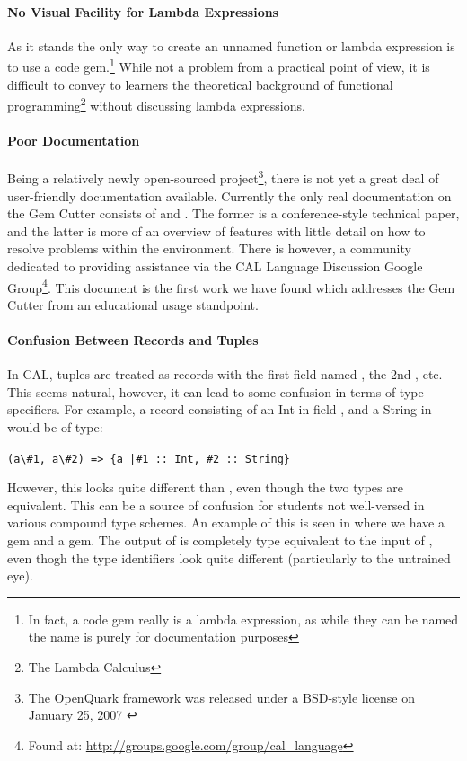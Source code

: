 \paragraph{No Visual Facility for Lambda Expressions}

As it stands the only way to create an unnamed function or lambda expression is to use a code gem.\footnote{In fact, a code gem really is a lambda expression, as while they can be named the name is purely for documentation purposes}  While not a problem from a practical point of view, it is difficult to convey to learners the theoretical background of functional programming\footnote{The Lambda Calculus} without discussing lambda expressions.

\paragraph{Poor Documentation}

Being a relatively newly open-sourced project\footnote{The OpenQuark framework was released under a BSD-style license on January 25, 2007 \cite{bobjNews}}, there is not yet a great deal of user-friendly documentation available.  Currently the only real documentation on the Gem Cutter consists of \cite{evans07} and \cite{evans06}.  The former is a conference-style technical paper, and the latter is more of an overview of features with little detail on how to resolve problems within the environment.  There is however, a community dedicated to providing assistance via the CAL Language Discussion Google Group\footnote{Found at: \url{http://groups.google.com/group/cal_language}}.  This document is the first work we have found which addresses the Gem Cutter from an educational usage standpoint.

\paragraph{Confusion Between Records and Tuples}

In CAL, tuples are treated as records with the first field named , the 2nd , etc.  This seems natural, however, it can lead to some confusion in terms of type specifiers.  For example, a record consisting of an Int in field , and a String in  would be of type:

\verb!(a\#1, a\#2) => {a |#1 :: Int, #2 :: String}!

However, this looks quite different than , even though the two types are equivalent.  This can be a source of confusion for students not well-versed in various compound type schemes.  An example of this is seen in  where we have a  gem and a  gem.  The output of  is completely type equivalent to the input of , even thogh the type identifiers look quite different (particularly to the untrained eye).

